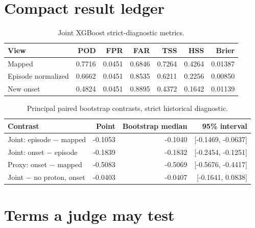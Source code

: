 \documentclass[11pt]{article}
\begin{document}
\appendix
\section{Compact result ledger}

\begin{table}[H]
\centering
\caption{Joint XGBoost strict-diagnostic metrics.}
\begin{tabular}{lrrrrrr}
\toprule
View & POD & FPR & FAR & TSS & HSS & Brier\\
\midrule
Mapped & 0.7716 & 0.0451 & 0.6846 & 0.7264 & 0.4264 & 0.01387\\
Episode normalized & 0.6662 & 0.0451 & 0.8535 & 0.6211 & 0.2256 & 0.00850\\
New onset & 0.4824 & 0.0451 & 0.8895 & 0.4372 & 0.1642 & 0.01139\\
\bottomrule
\end{tabular}
\end{table}

\begin{table}[H]
\centering
\caption{Principal paired bootstrap contrasts, strict historical diagnostic.}
\begin{tabular}{lrrr}
\toprule
Contrast & Point & Bootstrap median & 95\% interval\\
\midrule
Joint: episode $-$ mapped & -0.1053 & -0.1040 & [-0.1469, -0.0637]\\
Joint: onset $-$ episode & -0.1839 & -0.1832 & [-0.2454, -0.1251]\\
Proxy: onset $-$ mapped & -0.5083 & -0.5069 & [-0.5676, -0.4417]\\
Joint $-$ no proton, onset & -0.0403 & -0.0407 & [-0.1641, 0.0838]\\
\bottomrule
\end{tabular}
\end{table}

\section{Terms a judge may test}
\end{document}
